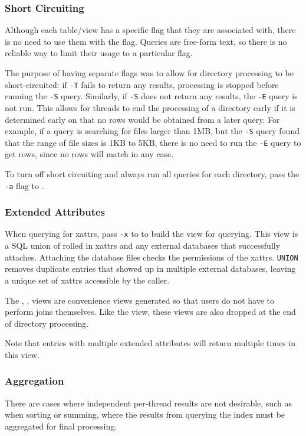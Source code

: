 \subsubsection{Short Circuiting}
Although each table/view has a specific flag that they are associated
with, there is no need to use them with the flag. Queries are
free-form text, so there is no reliable way to limit their usage to a
particular flag.

The purpose of having separate flags was to allow for directory
processing to be short-circuited: if \texttt{-T} fails to return any
results, processing is stopped before running the \texttt{-S}
query. Similarly, if \texttt{-S} does not return any results, the
\texttt{-E} query is not run. This allows for threads to end the
processing of a directory early if it is determined early on that no
rows would be obtained from a later query. For example, if a query is
searching for files larger than 1MB, but the \texttt{-S} query found
that the range of file sizes is 1KB to 5KB, there is no need to run
the \texttt{-E} query to get rows, since no rows will match in any
case.

To turn off short circuiting and always run all queries for each
directory, pass the \texttt{-a} flag to \gufiquery.

\subsubsection{Extended Attributes}
When querying for xattrs, pass \texttt{-x} to \gufiquery to build the
\xattrs view for querying. This view is a SQL union of rolled in
xattrs and any external databases that successfully
attaches. Attaching the database files checks the permissions of the
xattrs. \texttt{UNION} removes duplicate entries that showed up in
multiple external databases, leaving a unique set of xattrs accessible
by the caller.

The \xentries, \xpentries, \xsummary views are convenience views
generated so that users do not have to perform joins themselves. Like
the \xattrs view, these views are also dropped at the end of directory
processing.

Note that entries with multiple extended attributes will return
multiple times in this view.

\subsubsection{Aggregation}
There are cases where independent per-thread results are not
desirable, such as when sorting or summing, where the results from
querying the index must be aggregated for final processing.

